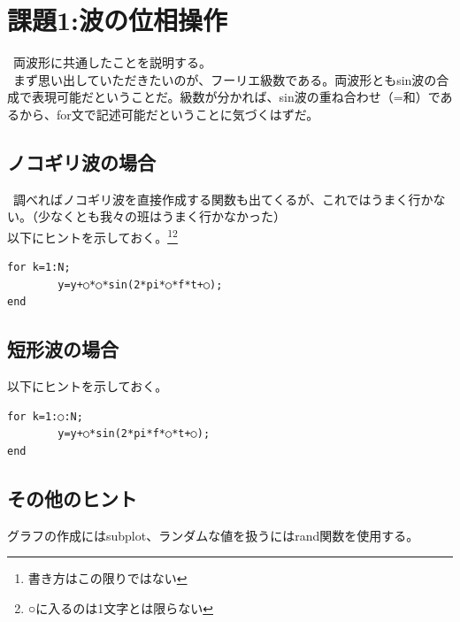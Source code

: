 \section{課題1:波の位相操作}
\ 両波形に共通したことを説明する。\\
\ まず思い出していただきたいのが、フーリエ級数である。両波形ともsin波の合成で表現可能だということだ。級数が分かれば、sin波の重ね合わせ（=和）であるから、for文で記述可能だということに気づくはずだ。\\
\subsection{ノコギリ波の場合}
\ 調べればノコギリ波を直接作成する関数も出てくるが、これではうまく行かない。（少なくとも我々の班はうまく行かなかった）\\
以下にヒントを示しておく。\footnote{書き方はこの限りではない}\footnote{○に入るのは1文字とは限らない}
\begin{verbatim}
for k=1:N;
        y=y+○*○*sin(2*pi*○*f*t+○);
end
\end{verbatim}

\subsection{短形波の場合}
以下にヒントを示しておく。\footnotemark[1]\footnotemark[2]
\begin{verbatim}
for k=1:○:N;
        y=y+○*sin(2*pi*f*○*t+○);
end
\end{verbatim}
\subsection{その他のヒント}
グラフの作成にはsubplot、ランダムな値を扱うにはrand関数を使用する。
